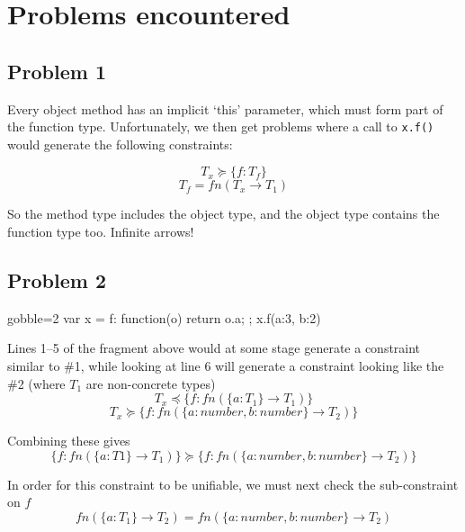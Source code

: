 \documentclass{article}
\begin{document}
\newcommand{\question}[1]{\colchunk{\begin{description}\item[Q:]{#1}%
    \end{description}}}
\newcommand{\answer}[1]{\colchunk{\begin{description}\item[A:]{#1}%
    \end{description}}\colplacechunks}

\section{Problems encountered}

\subsection*{Problem 1}
	
	Every object method has an implicit `this' parameter, which must form part
	of the function type. Unfortunately, we then get problems where a call to
	\texttt{x.f()} would generate the following constraints:

	$$ T_x \succeq \{f:T_f\}$$
	$$ T_f = fn (T_x \rightarrow T_1)$$

	So the method type includes the object type, and the object type contains
	the function type too. Infinite arrows!

\subsection*{Problem 2}

	\begin{jscode*}{gobble=2}
		var x = {
			f: function(o) {
				return o.a;
			}
		};
		x.f({a:3, b:2})
	\end{jscode*}

	Lines 1--5 of the fragment above would at some stage generate a constraint
	similar to \#1, while looking at line 6 will generate a constraint looking
	like the \#2 (where $T_1$ are non-concrete types)
	$$T_x \preceq \{f:fn(\{a:T_1\} \rightarrow T_1 ) \} $$
	$$T_x \succeq{} \{f:fn(\{a:number,b:number\} \rightarrow T_2 ) \} $$

	Combining these gives
	$$\{f:fn(\{a:T1\} \rightarrow T_1)\} \succeq \{f:fn(\{a:number,b:number\} \rightarrow T_2 ) \} $$

	In order for this constraint to be unifiable, we must next check the sub-constraint
	on $f$
	$$fn(\{a:T_1\} \rightarrow T_2) = fn(\{a:number,b:number\} \rightarrow
	T_2)$$
\end{document}
